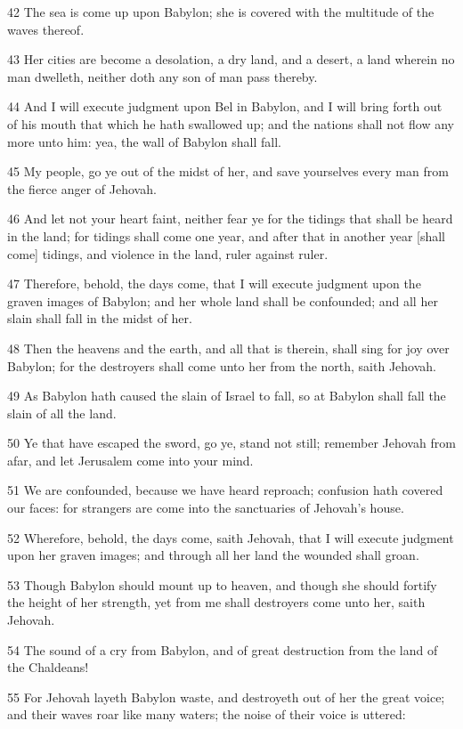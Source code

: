 \par 42 The sea is come up upon Babylon; she is covered with the multitude of the waves thereof.
\par 43 Her cities are become a desolation, a dry land, and a desert, a land wherein no man dwelleth, neither doth any son of man pass thereby.
\par 44 And I will execute judgment upon Bel in Babylon, and I will bring forth out of his mouth that which he hath swallowed up; and the nations shall not flow any more unto him: yea, the wall of Babylon shall fall.
\par 45 My people, go ye out of the midst of her, and save yourselves every man from the fierce anger of Jehovah.
\par 46 And let not your heart faint, neither fear ye for the tidings that shall be heard in the land; for tidings shall come one year, and after that in another year [shall come] tidings, and violence in the land, ruler against ruler.
\par 47 Therefore, behold, the days come, that I will execute judgment upon the graven images of Babylon; and her whole land shall be confounded; and all her slain shall fall in the midst of her.
\par 48 Then the heavens and the earth, and all that is therein, shall sing for joy over Babylon; for the destroyers shall come unto her from the north, saith Jehovah.
\par 49 As Babylon hath caused the slain of Israel to fall, so at Babylon shall fall the slain of all the land.
\par 50 Ye that have escaped the sword, go ye, stand not still; remember Jehovah from afar, and let Jerusalem come into your mind.
\par 51 We are confounded, because we have heard reproach; confusion hath covered our faces: for strangers are come into the sanctuaries of Jehovah's house.
\par 52 Wherefore, behold, the days come, saith Jehovah, that I will execute judgment upon her graven images; and through all her land the wounded shall groan.
\par 53 Though Babylon should mount up to heaven, and though she should fortify the height of her strength, yet from me shall destroyers come unto her, saith Jehovah.
\par 54 The sound of a cry from Babylon, and of great destruction from the land of the Chaldeans!
\par 55 For Jehovah layeth Babylon waste, and destroyeth out of her the great voice; and their waves roar like many waters; the noise of their voice is uttered:
